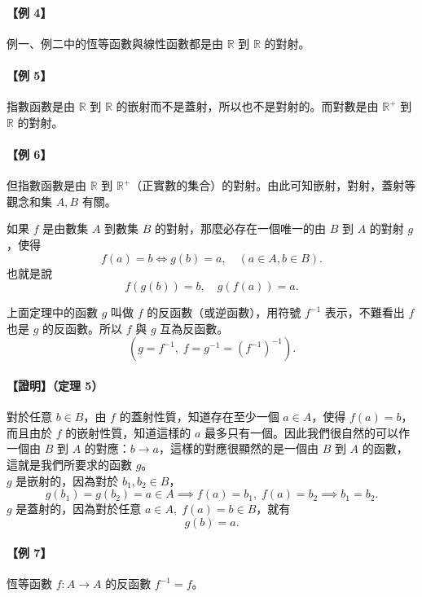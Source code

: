 \paragraph{【例 4】} 例一、例二中的恆等函數與線性函數都是由 $\mathbb{R}$ 到 $\mathbb{R}$ 的對射。

\paragraph{【例 5】} 指數函數是由 $\mathbb{R}$ 到 $\mathbb{R}$ 的嵌射而不是蓋射，所以也不是對射的。而對數是由 $\mathbb{R}^+$ 到 $\mathbb{R}$ 的對射。

\paragraph{【例 6】} 但指數函數是由 $\mathbb{R}$ 到 $\mathbb{R}^+$（正實數的集合）的對射。由此可知嵌射，對射，蓋射等觀念和集 $A, B$ 有關。

\begin{theorem}
如果 $f$ 是由數集 $A$ 到數集 $B$ 的對射，那麼必存在一個唯一的由 $B$ 到 $A$ 的對射 $g$，使得
\[
f(a) = b \iff g(b) = a,\quad (a \in A, b \in B).
\]
也就是說
\[
f(g(b)) = b,\quad g(f(a)) = a.
\]
\end{theorem}

\begin{definition*}
上面定理中的函數 $g$ 叫做 $f$ 的反函數（或逆函數），用符號 $f^{-1}$ 表示，不難看出 $f$ 也是 $g$ 的反函數。所以 $f$ 與 $g$ 互為反函數。
\[
(g = f^{-1},\; f = g^{-1} = (f^{-1})^{-1}).
\]
\end{definition*}
\paragraph{【證明】（定理 5）} 對於任意 $b \in B$，由 $f$ 的蓋射性質，知道存在至少一個 $a \in A$，使得 $f(a) = b$，而且由於 $f$ 的嵌射性質，知道這樣的 $a$ 最多只有一個。因此我們很自然的可以作一個由 $B$ 到 $A$ 的對應：$b \longrightarrow a$，這樣的對應很顯然的是一個由 $B$ 到 $A$ 的函數，這就是我們所要求的函數 $g$。\\
$g$ 是嵌射的，因為對於 $b_1, b_2 \in B$，
\[
g(b_1) = g(b_2) = a \in A \implies f(a) = b_1,\; f(a) = b_2 \implies b_1 = b_2.
\]
$g$ 是蓋射的，因為對於任意 $a \in A,\; f(a) = b \in B$，就有
\[
g(b) = a.
\]

\paragraph{【例 7】} 恆等函數 $f: A \to A$ 的反函數 $f^{-1} = f$。

